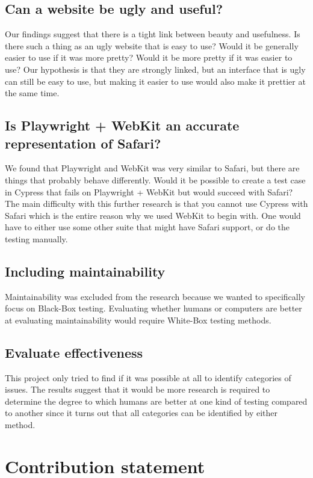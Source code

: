 \documentclass[journal,twocolumn]{IEEEtran}
\begin{document}
\subsection{Can a website be ugly and useful?}
Our findings suggest that there is a tight link between beauty and usefulness. Is there such a thing as an ugly website that is easy to use? Would it be generally easier to use if it was more pretty? Would it be more pretty if it was easier to use? Our hypothesis is that they are strongly linked, but an interface that is ugly can still be easy to use, but making it easier to use would also make it prettier at the same time.

\subsection{Is Playwright + WebKit an accurate representation of Safari?}
We found that Playwright and WebKit was very similar to Safari, but there are things that probably behave differently. Would it be possible to create a test case in Cypress that fails on Playwright + WebKit but would succeed with Safari? The main difficulty with this further research is that you cannot use Cypress with Safari which is the entire reason why we used WebKit to begin with. One would have to either use some other suite that might have Safari support, or do the testing manually.

\subsection{Including maintainability}
Maintainability was excluded from the research because we wanted to specifically focus on Black-Box testing. Evaluating whether humans or computers are better at evaluating maintainability would require White-Box testing methods.

\subsection{Evaluate effectiveness}
This project only tried to find if it was possible at all to identify categories of issues. The results suggest that it would be more research is required to determine the degree to which humans are better at one kind of testing compared to another since it turns out that all categories can be identified by either method.

\section{Contribution statement}
\end{document}
